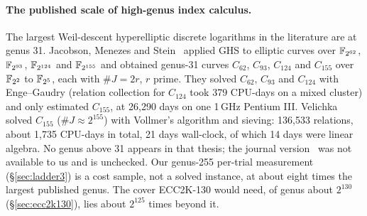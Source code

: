 \paragraph{The published scale of high-genus index calculus.} The largest
Weil-descent hyperelliptic discrete logarithms in the literature are at
genus 31. Jacobson, Menezes and Stein~\cite{jms2001} applied GHS to elliptic
curves over $\mathbb{F}_{2^{62}}$, $\mathbb{F}_{2^{93}}$, $\mathbb{F}_{2^{124}}$ and
$\mathbb{F}_{2^{155}}$ and obtained genus-31 curves $C_{62}$, $C_{93}$, $C_{124}$
and $C_{155}$ over $\mathbb{F}_{2^2}$ to $\mathbb{F}_{2^5}$, each with $\#J=2r$, $r$
prime. They solved $C_{62}$, $C_{93}$ and $C_{124}$ with Enge--Gaudry
(relation collection for $C_{124}$ took 379 CPU-days on a mixed cluster) and
only estimated $C_{155}$, at 26{,}290 days on one 1\,GHz Pentium III.
Velichka~\cite{velichka2008} solved $C_{155}$ ($\#J\approx2^{155}$) with
Vollmer's algorithm and sieving: 136{,}533 relations, about 1{,}735 CPU-days
in total, 21 days wall-clock, of which 14 days were linear algebra. No genus
above 31 appears in that thesis; the journal version~\cite{vjs2014} was not
available to us and is unchecked. Our genus-255 per-trial measurement
(\S\ref{sec:ladder3}) is a cost sample, not a solved instance, at about
eight times the largest published genus. The cover ECC2K-130 would need, of
genus about $2^{130}$ (\S\ref{sec:ecc2k130}), lies about $2^{125}$ times
beyond it.


